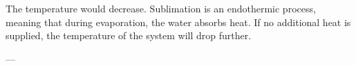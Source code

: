 The temperature would decrease. Sublimation is an endothermic process, meaning that during evaporation, the water absorbs heat. If no additional heat is supplied, the temperature of the system will drop further.

---